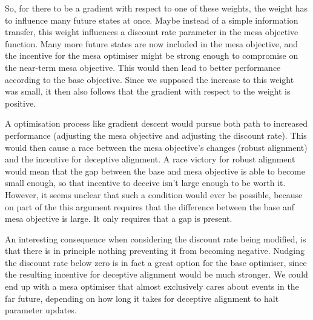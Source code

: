 \documentclass[11pt]{article}
\begin{document}
So, for there to be a gradient with respect to one of these weights, the weight has to influence many future states at
once.
Maybe instead of a simple information transfer, this weight influences a discount rate parameter in the mesa objective
function.
Many more future states are now included in the mesa objective, and the incentive for the mesa optimiser might be strong
enough to compromise on the near-term mesa objective.
This would then lead to better performance according to the base objective.
Since we supposed the increase to this weight was small, it then also follows that the gradient with respect to the
weight is positive.

A optimisation process like gradient descent would pursue both path to increased performance
(adjusting the mesa objective and adjusting the discount rate).
This would then cause a race between the mesa objective's changes (robust alignment) and the incentive for deceptive
alignment.
A race victory for robust alignment would mean that the gap between the base and mesa objective is able to become
small enough, so that incentive to deceive isn't large enough to be worth it.
However, it seems unclear that such a condition would ever be possible, because on part of the this argument requires
that the difference between the base anf mesa objective is large.
It only requires that a gap is present.

An interesting consequence when considering the discount rate being modified, is that there is in principle nothing
preventing it from becoming negative.
Nudging the discount rate below zero is in fact a great option for the base optimiser, since the resulting incentive
for deceptive alignment would be much stronger.
We could end up with a mesa optimiser that almost exclusively cares about events in the far future, depending on how
long it takes for deceptive alignment to halt parameter updates.
\end{document}
